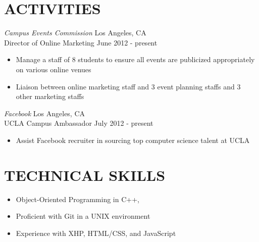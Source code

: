 \documentclass{res}
\begin{document}
\begin{resume}
\section{ACTIVITIES}
\vspace{6pt}
  {\sl Campus Events Commission} \hfill Los Angeles, CA \\
  Director of Online Marketing \hfill June 2012 - present
  \begin{itemize} \itemsep -2pt
    \item Manage a staff of 8 students to ensure all events are publicized appropriately on various online venues
    \item Liaison between online marketing staff and 3 event planning staffs and 3 other marketing staffs
  \end{itemize} \vspace{-6pt}

  {\sl Facebook} \hfill Los Angeles, CA \\
  UCLA Campus Ambassador \hfill July 2012 - present
  \begin{itemize} \itemsep -2pt
    \item Assist Facebook recruiter in sourcing top computer science talent at UCLA
  \end{itemize} \vspace{-6pt}

\section{TECHNICAL SKILLS}
\vspace{0.2in}
  \begin{itemize}  \itemsep -2pt
    \item Object-Oriented Programming in C++,
    \item Proficient with Git in a UNIX environment
    \item Experience with XHP, HTML/CSS, and JavaScript
  \end{itemize}
\end{resume}
\end{document}
